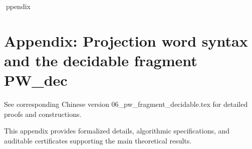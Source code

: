 ppendix

\section*{Appendix: Projection word syntax and the decidable fragment PW_dec}

See corresponding Chinese version 06_pw_fragment_decidable.tex for detailed proofs and constructions.

This appendix provides formalized details, algorithmic specifications, and auditable certificates supporting the main theoretical results.
